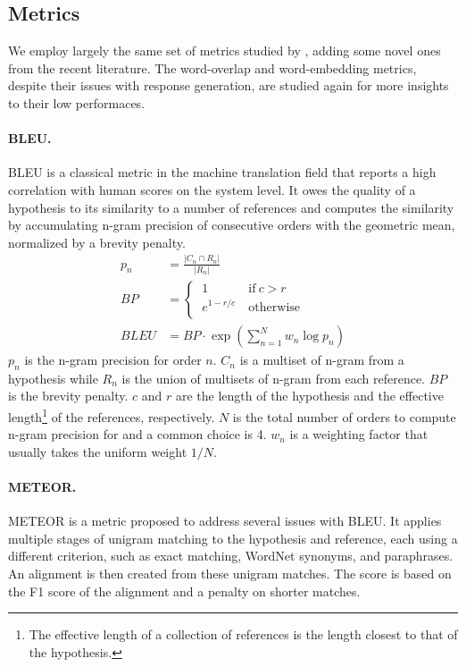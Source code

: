 \documentclass[runningheads]{llncs}
\begin{document}
    \subsection{Metrics}
    We employ largely the same set of metrics studied by \cite{HowNot}, adding some novel ones from the recent literature. The word-overlap and word-embedding metrics, despite their issues with response generation, are studied again for more insights to their low performaces.

    \paragraph{BLEU.}
    BLEU \cite{BLEU} is a classical metric in the machine translation field that reports a high correlation with human scores on the system level. It owes the quality of a hypothesis to its similarity to a number of references and computes the similarity by accumulating n-gram precision of consecutive orders with the geometric mean, normalized by a brevity penalty.
    \begin{align}
        p_n &= \frac{ |C_n \cap R_n| }{ |R_n| } \\
        \textit{BP} &=
        \begin{cases}
            \ 1 \ & \text{if} \  c > r \\
            \ e^{1 - r/c} \ & \text{otherwise} \\
        \end{cases} \\
        \textit{BLEU} &=
        \textit{BP} \cdot \exp \left( \sum_{n=1}^N w_n \log p_n \right)
    \end{align}
    $p_n$ is the n-gram precision for order $n$. $C_n$ is a multiset of n-gram from a hypothesis while $R_n$ is the union of multisets of n-gram from each reference. $\textit{BP}$ is the brevity penalty. $c$ and $r$ are the length of the hypothesis and the effective length\footnote{The effective length of a collection of references is the length closest to that of the hypothesis.} of the references, respectively. $N$ is the total number of orders to compute n-gram precision for and a common choice is 4. $w_n$ is a weighting factor that usually takes the uniform weight $1 / N$.

    \paragraph{METEOR.}
    METEOR \cite{METEOR} is a metric proposed to address several issues with BLEU. It applies multiple stages of unigram matching to the hypothesis and reference, each using a different criterion, such as exact matching, WordNet synonyms, and paraphrases. An alignment is then created from these unigram matches. The score is based on the F1 score of the alignment and a penalty on shorter matches.
\end{document}
